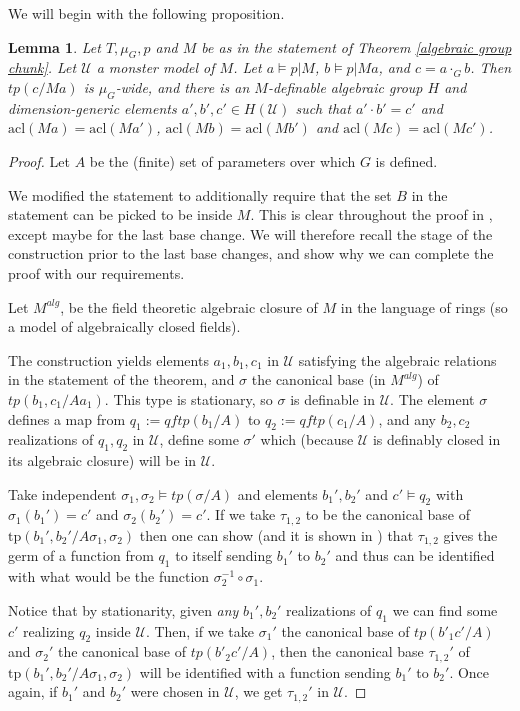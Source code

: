 \documentclass[12pt]{article}
\newtheorem{lemme}[thm]{Lemma}
\theoremstyle{definition}
\theoremstyle{mystyle}
\theoremstyle{remark}
\newcommand{\acl}{\mathrm{acl}}
\newcommand{\tp}{\mathrm{tp}}
\begin{document}
We will begin with the following proposition.

\begin{lemme}\label{prop_groupconf}
Let $T, \mu_G,p$ and $M$ be as in the statement of Theorem
\ref{algebraic group chunk}. Let $\mathcal{U}$ a monster model of
$M$. Let $a\models p|M$, $b\models p|Ma$, and $c=a\cdot_G b$. Then
$tp(c/Ma)$ is $\mu_G$-wide, and there is an $M$-definable
algebraic group $H$ and dimension-generic elements $a', b', c'\in
H(\mathcal{U})$ such that $a'\cdot b' = c'$ and
$\acl(Ma)=\acl(Ma')$, $\acl(Mb)=\acl(Mb')$ and
$\acl(Mc)=\acl(Mc')$.
\end{lemme}


\begin{proof}
Let $A$ be the (finite) set of parameters over which $G$ is
defined.

We modified the statement to additionally require that the set $B$
in the statement can be picked to be inside $M$. This is clear
throughout the proof in \cite{HrPi}, except maybe for the last
base change. We will therefore recall the stage of the
construction prior to the last base changes, and show why we can
complete the proof with our requirements.

Let $M^{alg}$, be the field theoretic algebraic closure of $M$ in
the language of rings (so a model of algebraically closed fields).

The construction yields elements  $a_1, b_1, c_1$ in $\mathcal U$
satisfying the algebraic relations in the statement of the
theorem, and $\sigma$ the canonical base (in $M^{alg}$) of
$tp(b_1, c_1/A a_1)$. This type is stationary, so $\sigma$ is
definable in $\mathcal U$. The element $\sigma$ defines a map from
$q_1:=qftp(b_1/A)$ to $q_2:=qftp(c_1/A)$, and any $b_2, c_2$
realizations of $q_1, q_2$ in $\mathcal U$, define some $\sigma'$
which (because $\mathcal U$ is definably closed in its algebraic
closure) will be in $\mathcal U$.


Take independent $\sigma_1, \sigma_2\models tp(\sigma/A)$ and
elements $b_1', b_2'$ and $c'\models q_2$ with $\sigma_1(b_1')=c'$
and $\sigma_2(b_2')=c'$. If we take $\tau_{1,2}$ to be the
canonical base of $\tp(b_1', b_2'/A\sigma_1, \sigma_2)$ then one
can show (and it is shown in \cite{HrPi}) that $\tau_{1,2}$ gives
the germ of a function from $q_1$ to itself sending $b_1'$ to
$b_2'$ and thus can be identified with what would be the function
$\sigma_2^{-1}\circ \sigma_1$.

Notice that by stationarity, given \emph{any} $b_1', b_2'$
realizations of $q_1$ we can find some $c'$ realizing $q_2$ inside
$\mathcal U$. Then, if we take $\sigma_1'$ the canonical base of
$tp(b'_1 c'/A)$ and $\sigma_2'$ the canonical base of $tp(b'_2
c'/A)$, then the canonical base $\tau_{1,2}'$ of $\tp(b_1',
b_2'/A\sigma_1, \sigma_2)$ will be identified with a function
sending $b_1'$ to $b_2'$. Once again, if $b_1'$ and $b_2'$ were
chosen in $\mathcal U$, we get $\tau_{1,2}'$ in $\mathcal U$.



\end{proof}
\end{document}
